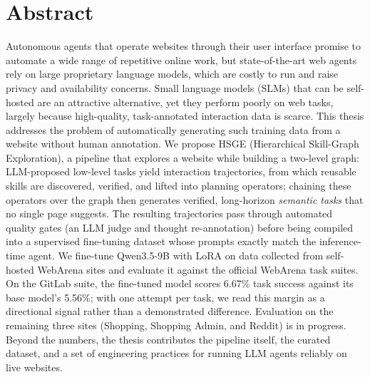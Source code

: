 \chapter*{Abstract}


Autonomous agents that operate websites through their user interface promise
to automate a wide range of repetitive online work, but state-of-the-art web
agents rely on large proprietary language models, which are costly to run and
raise privacy and availability concerns. Small language models (SLMs) that can
be self-hosted are an attractive alternative, yet they perform poorly on web
tasks, largely because high-quality, task-annotated interaction data is scarce.
This thesis addresses the problem of automatically generating such training
data from a website without human annotation. We propose HSGE (Hierarchical
Skill-Graph Exploration), a pipeline that explores a website while building a
two-level graph: LLM-proposed low-level tasks yield interaction trajectories,
from which reusable skills are discovered, verified, and lifted into planning
operators; chaining these operators over the graph then generates verified,
long-horizon \emph{semantic tasks} that no single page suggests. The resulting
trajectories pass through automated quality gates (an LLM judge and thought
re-annotation) before being compiled into a supervised fine-tuning dataset
whose prompts exactly match the inference-time agent. We fine-tune
Qwen3.5-9B with LoRA on data collected from self-hosted WebArena sites and
evaluate it against the official WebArena task suites. On the GitLab suite,
the fine-tuned model scores 6.67\% task success against its base model's
5.56\%; with one attempt per task, we read this margin as a directional
signal rather than a demonstrated difference. Evaluation on the remaining
three sites (Shopping, Shopping Admin, and Reddit) is in progress. Beyond the numbers, the thesis contributes
the pipeline itself, the curated dataset, and a set of engineering practices
for running LLM agents reliably on live websites.
